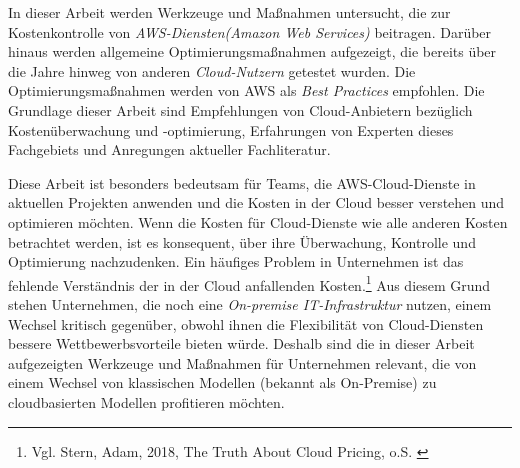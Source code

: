 \begin{flushleft}In dieser Arbeit werden Werkzeuge und Maßnahmen untersucht, die zur Kostenkontrolle von \textit{AWS-Diensten(Amazon Web Services)} beitragen. Darüber hinaus werden allgemeine Optimierungsmaßnahmen aufgezeigt, die bereits über die Jahre hinweg von anderen \textit{Cloud-Nutzern} getestet wurden. Die Optimierungsmaßnahmen werden von AWS als \textit{Best Practices} empfohlen. Die Grundlage dieser Arbeit sind Empfehlungen von Cloud-Anbietern bezüglich Kostenüberwachung und -optimierung, Erfahrungen von Experten dieses Fachgebiets und Anregungen aktueller Fachliteratur.
\end{flushleft}
\begin{flushleft}
Diese Arbeit ist besonders bedeutsam für Teams, die AWS-Cloud-Dienste in aktuellen Projekten anwenden und die Kosten in der Cloud besser verstehen und optimieren möchten. Wenn die Kosten für Cloud-Dienste wie alle anderen Kosten betrachtet werden, ist es konsequent, über ihre Überwachung, Kontrolle und Optimierung nachzudenken. Ein häufiges Problem in Unternehmen ist das fehlende Verständnis der in der Cloud anfallenden Kosten.\footnote{Vgl. Stern, Adam, 2018, The Truth About Cloud Pricing, o.S. \cite{SP1}} Aus diesem Grund stehen Unternehmen, die noch eine \textit{On-premise IT-Infrastruktur} nutzen, einem Wechsel kritisch gegenüber, obwohl ihnen die Flexibilität von Cloud-Diensten bessere Wettbewerbsvorteile bieten würde. Deshalb sind die in dieser Arbeit aufgezeigten Werkzeuge und Maßnahmen für Unternehmen relevant, die von einem Wechsel von klassischen Modellen (bekannt als On-Premise) zu cloudbasierten Modellen profitieren möchten.
\end{flushleft}

